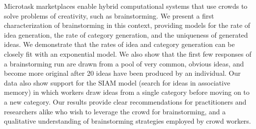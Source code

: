 Microtask marketplaces enable hybrid computational systems that use crowds to solve problems of creativity, such as brainstorming. We present a first characterization of brainstorming in this context, providing models for the rate of idea generation, the rate of category generation, and the uniqueness of generated ideas. We demonstrate that the rates of idea and category generation can be closely fit with an exponential model. We also show that the first few responses of a brainstorming run are drawn from a pool of very common, obvious ideas, and become more original after 20 ideas have been produced by an individual. Our data also show support for the SIAM model (search for ideas in associative memory) \cite{nijstad_how_2006} in which workers draw ideas from a single category before moving on to a new category. Our results provide clear recommendations for practitioners and researchers alike who wish to leverage the crowd for brainstorming, and a qualitative understanding of brainstorming strategies employed by crowd workers.


